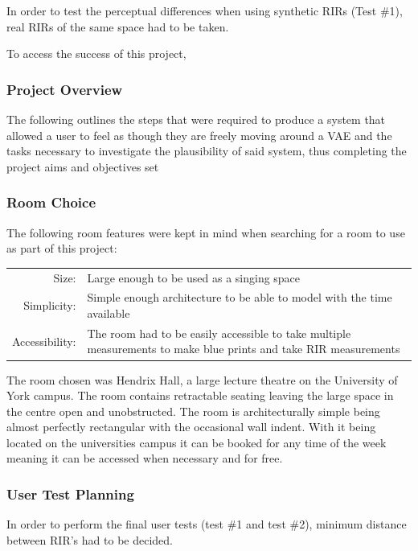\documentclass[../../main.tex]{subfiles}
\begin{document}
	In order to test the perceptual differences when using synthetic RIRs (Test \#1), real RIRs of the same space had to be taken.

	To access the success of this project, 




		\subsubsection{Project Overview}

			The following outlines the steps that were required to produce a system that allowed a user to feel as though they are freely moving around a \ac{VAE} and the tasks necessary to investigate the plausibility of said system, thus completing the project aims and objectives set

		\subsubsection{Room Choice}

			The following room features were kept in mind when searching for a room to use as part of this project:

			\begin{center}
			\begin{tabular}{r p{12cm}}
				Size: & Large enough to be used as a singing space \\
				Simplicity: & Simple enough architecture to be able to model with the time available \\
				Accessibility: & The room had to be easily accessible to take  multiple measurements to make blue prints and take \ac{RIR} measurements
			\end{tabular}
			\end{center}

			The room chosen was Hendrix Hall, a large lecture theatre on the University of York campus. The room contains retractable seating leaving the large space in the centre open and unobstructed. The room is architecturally simple being almost perfectly rectangular with the occasional wall indent. With it being located on the universities campus it can be booked for any time of the week meaning it can be accessed when necessary and for free.

		\subsubsection{User Test Planning}
		\label{Background:RIRPositions}

			In order to perform the final user tests (test \#1 and test \#2), minimum distance between \ac{RIR}'s had to be decided.
\end{document}
